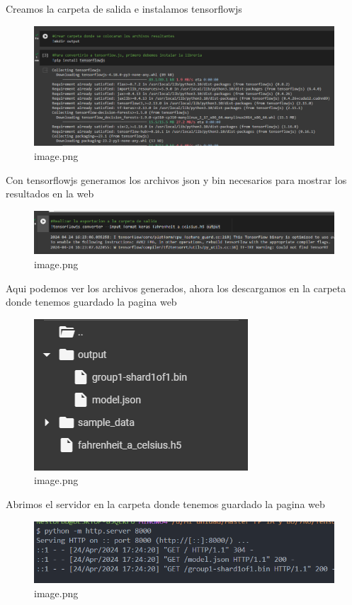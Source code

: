 \documentclass[11pt]{article}
\begin{document}
    Creamos la carpeta de salida e instalamos tensorflowjs

    \begin{figure}
\centering
\includegraphics{Grados/img/crear carpeta y instalar tensorflowjs.png}
\caption{image.png}
\end{figure}

    Con tensorflowjs generamos los archivos json y bin necesarios para
mostrar los resultados en la web

    \begin{figure}
\centering
\includegraphics{Grados/img/generar json.png}
\caption{image.png}
\end{figure}

    Aqui podemos ver los archivos generados, ahora los descargamos en la
carpeta donde tenemos guardado la pagina web

    \begin{figure}
\centering
\includegraphics{Grados/img/archivos generados.png}
\caption{image.png}
\end{figure}

    Abrimos el servidor en la carpeta donde tenemos guardado la pagina web

    \begin{figure}
\centering
\includegraphics{Grados/img/abrir servidor.png}
\caption{image.png}
\end{figure}
\end{document}
